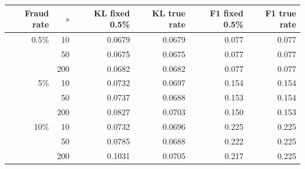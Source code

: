 \begin{tabular}{rrrrrr}\toprule
Fraud rate & $s$ & KL fixed 0.5\% & KL true rate & F1 fixed 0.5\% & F1 true rate\\\midrule
0.5\% & 10 & 0.0679 & 0.0679 & 0.077 & 0.077\\
 & 50 & 0.0675 & 0.0675 & 0.077 & 0.077\\
 & 200 & 0.0682 & 0.0682 & 0.077 & 0.077\\
\midrule
5\% & 10 & 0.0732 & 0.0697 & 0.154 & 0.154\\
 & 50 & 0.0737 & 0.0688 & 0.153 & 0.154\\
 & 200 & 0.0827 & 0.0703 & 0.150 & 0.153\\
\midrule
10\% & 10 & 0.0732 & 0.0696 & 0.225 & 0.225\\
 & 50 & 0.0785 & 0.0688 & 0.222 & 0.225\\
 & 200 & 0.1031 & 0.0705 & 0.217 & 0.225\\
\bottomrule\end{tabular}